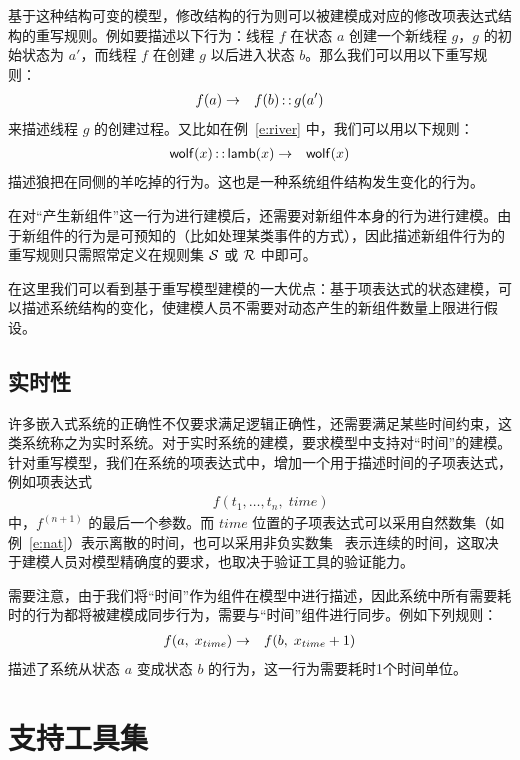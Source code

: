 基于这种结构可变的模型，修改结构的行为则可以被建模成对应的修改项表达式结构的重写规则。例如要描述以下行为：线程 $f$ 在状态 $a$ 创建一个新线程 $g$，$g$ 的初始状态为 $a'$，而线程 $f$ 在创建 $g$ 以后进入状态 $b$。那么我们可以用以下重写规则：
\begin{eqnarray}
f(a) & \rightarrow & f(b) \operatorname{\mathsf{::}} g(a') \nonumber
\end{eqnarray}
来描述线程 $g$ 的创建过程。又比如在例~\ref{e:river} 中，我们可以用以下规则：
\begin{eqnarray}
\operatorname{\mathsf{wolf}}(x)\operatorname{\mathsf{::}}\operatorname{\mathsf{lamb}}(x) & \rightarrow & \operatorname{\mathsf{wolf}}(x) \nonumber
\end{eqnarray}
描述狼把在同侧的羊吃掉的行为。这也是一种系统组件结构发生变化的行为。

在对“产生新组件”这一行为进行建模后，还需要对新组件本身的行为进行建模。由于新组件的行为是可预知的（比如处理某类事件的方式），因此描述新组件行为的重写规则只需照常定义在规则集 $\mathcal{S}$ 或 $\mathcal{R}$ 中即可。

在这里我们可以看到基于重写模型建模的一大优点：基于项表达式的状态建模，可以描述系统结构的变化，使建模人员不需要对动态产生的新组件数量上限进行假设。

\subsection{实时性}

许多嵌入式系统的正确性不仅要求满足逻辑正确性，还需要满足某些时间约束，这类系统称之为实时系统。对于实时系统的建模，要求模型中支持对“时间”的建模。针对重写模型，我们在系统的项表达式中，增加一个用于描述时间的子项表达式，例如项表达式
\begin{eqnarray}
& & f(t_1,\ldots,t_n,\; time) \nonumber
\end{eqnarray}
中，$f^{(n+1)}$ 的最后一个参数。而 $time$ 位置的子项表达式可以采用自然数集（如例~\ref{e:nat}）表示离散的时间，也可以采用非负实数集~\cite{DBLP:journals/tcs/GoguenM92} 表示连续的时间，这取决于建模人员对模型精确度的要求，也取决于验证工具的验证能力。

需要注意，由于我们将“时间”作为组件在模型中进行描述，因此系统中所有需要耗时的行为都将被建模成同步行为，需要与“时间”组件进行同步。例如下列规则：
\begin{eqnarray}
f(a,\; x_{time}) & \rightarrow & f(b,\; x_{time}+1) \nonumber
\end{eqnarray}
描述了系统从状态 $a$ 变成状态 $b$ 的行为，这一行为需要耗时1个时间单位。

\section{支持工具集}
\label{s:tool}

